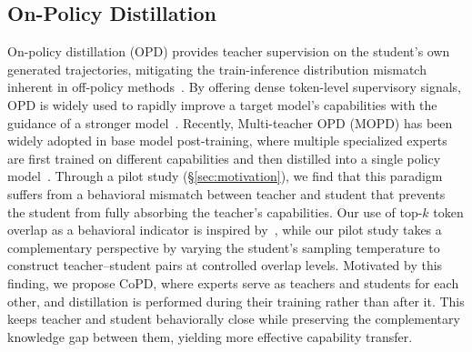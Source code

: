 \subsection{On-Policy Distillation}
On-policy distillation (OPD) provides teacher supervision on the student's own generated trajectories, mitigating the train-inference distribution mismatch inherent in off-policy methods~\cite{agarwal2024gkd,gu2026minillmonpolicydistillationlarge}. By offering dense token-level supervisory signals, OPD is widely used to rapidly improve a target model's capabilities with the guidance of a stronger model~\cite{lu2025onpolicy-opd, yang2025qwen3technicalreport, zhao2026opsd, hbotter2026reinforcementlearningselfdistillation_sdpo}. Recently, Multi-teacher OPD (MOPD) has been widely adopted in base model post-training, where multiple specialized experts are first trained on different capabilities and then distilled into a single policy model~\cite{mimo2025flash-mopd,deepseekai2026deepseekv4,yang2025qwen3technicalreport}. 
Through a pilot study (\S\ref{sec:motivation}), we find that this paradigm suffers from a behavioral mismatch between teacher and student that prevents the student from fully absorbing the teacher's capabilities. Our use of top-$k$ token overlap as a behavioral indicator is inspired by~\citet{li2026rethinkingonpolicydistillationlarge}, while our pilot study takes a complementary perspective by varying the student's sampling temperature to construct teacher--student pairs at controlled overlap levels. Motivated by this finding, we propose CoPD, where experts serve as teachers and students for each other, and distillation is performed during their training rather than after it. This keeps teacher and student behaviorally close while preserving the complementary knowledge gap between them, yielding more effective capability transfer.
